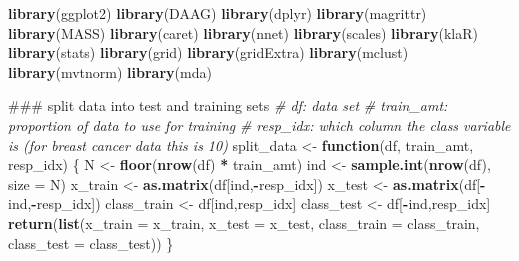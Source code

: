 \documentclass[]{article}
\newenvironment{Shaded}{\begin{snugshade}}{\end{snugshade}}
\newcommand{\KeywordTok}[1]{\textcolor[rgb]{0.13,0.29,0.53}{\textbf{#1}}}
\newcommand{\DataTypeTok}[1]{\textcolor[rgb]{0.13,0.29,0.53}{#1}}
\newcommand{\StringTok}[1]{\textcolor[rgb]{0.31,0.60,0.02}{#1}}
\newcommand{\CommentTok}[1]{\textcolor[rgb]{0.56,0.35,0.01}{\textit{#1}}}
\newcommand{\ControlFlowTok}[1]{\textcolor[rgb]{0.13,0.29,0.53}{\textbf{#1}}}
\newcommand{\OperatorTok}[1]{\textcolor[rgb]{0.81,0.36,0.00}{\textbf{#1}}}
\newcommand{\NormalTok}[1]{#1}
\begin{document}
\begin{Shaded}
\begin{Highlighting}[]
\KeywordTok{library}\NormalTok{(ggplot2)}
\KeywordTok{library}\NormalTok{(DAAG)}
\KeywordTok{library}\NormalTok{(dplyr)}
\KeywordTok{library}\NormalTok{(magrittr)}
\KeywordTok{library}\NormalTok{(MASS)}
\KeywordTok{library}\NormalTok{(caret)}
\KeywordTok{library}\NormalTok{(nnet) }
\KeywordTok{library}\NormalTok{(scales)}
\KeywordTok{library}\NormalTok{(klaR)}
\KeywordTok{library}\NormalTok{(stats)}
\KeywordTok{library}\NormalTok{(grid)}
\KeywordTok{library}\NormalTok{(gridExtra)}
\KeywordTok{library}\NormalTok{(mclust)}
\KeywordTok{library}\NormalTok{(mvtnorm)}
\KeywordTok{library}\NormalTok{(mda)}


\NormalTok{### split data into test and training sets}
\CommentTok{# df:         data set}
\CommentTok{# train_amt:  proportion of data to use for training}
\CommentTok{# resp_idx:   which column the class variable is (for breast cancer data this is 10)}
\NormalTok{split_data <-}\StringTok{ }\ControlFlowTok{function}\NormalTok{(df, train_amt, resp_idx) \{}
\NormalTok{  N <-}\StringTok{ }\KeywordTok{floor}\NormalTok{(}\KeywordTok{nrow}\NormalTok{(df) }\OperatorTok{*}\StringTok{ }\NormalTok{train_amt)}
\NormalTok{  ind <-}\StringTok{ }\KeywordTok{sample.int}\NormalTok{(}\KeywordTok{nrow}\NormalTok{(df), }\DataTypeTok{size =}\NormalTok{ N)}
\NormalTok{  x_train <-}\StringTok{ }\KeywordTok{as.matrix}\NormalTok{(df[ind,}\OperatorTok{-}\NormalTok{resp_idx])}
\NormalTok{  x_test <-}\StringTok{ }\KeywordTok{as.matrix}\NormalTok{(df[}\OperatorTok{-}\NormalTok{ind,}\OperatorTok{-}\NormalTok{resp_idx])}
\NormalTok{  class_train <-}\StringTok{ }\NormalTok{df[ind,resp_idx]}
\NormalTok{  class_test <-}\StringTok{ }\NormalTok{df[}\OperatorTok{-}\NormalTok{ind,resp_idx]}
  \KeywordTok{return}\NormalTok{(}\KeywordTok{list}\NormalTok{(}\DataTypeTok{x_train =}\NormalTok{ x_train,}
              \DataTypeTok{x_test =}\NormalTok{ x_test,}
              \DataTypeTok{class_train =}\NormalTok{ class_train,}
              \DataTypeTok{class_test =}\NormalTok{ class_test))}
\NormalTok{\}}


\end{Highlighting}
\end{Shaded}
\end{document}
